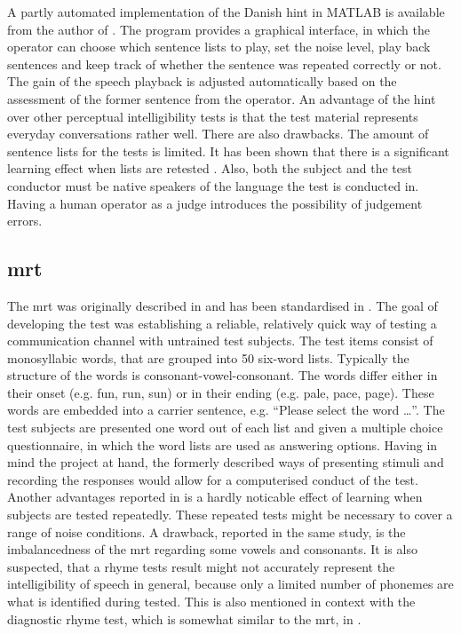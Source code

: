 A partly automated implementation of the Danish \gls{hint} in MATLAB\textsuperscript{\textregistered} is available from the author of \citep{hint_2011}. The program provides a graphical interface, in which the operator can choose which sentence lists to play, set the noise level, play back sentences and keep track of whether the sentence was repeated correctly or not. The gain of the speech playback is adjusted automatically based on the assessment of the former sentence from the operator.
An advantage of the \gls{hint} over other perceptual intelligibility tests is that the test material represents everyday conversations rather well.
There are also drawbacks. The amount of sentence lists for the tests is limited. It has been shown that there is a significant learning effect when lists are retested \citep[p. 205 f.]{hint_2011}.
Also, both the subject and the test conductor must be native speakers of the language the test is conducted in. Having a human operator as a judge introduces the possibility of judgement errors.

\subsection{\gls{mrt}}\label{ssec:mrt}
The \gls{mrt} was originally described in \citep{mrt_63} and has been standardised in \citep{ansi_s3.2}. The goal of developing the test was establishing a reliable, relatively quick way of testing a communication channel with untrained test subjects.
The test items consist of monosyllabic words, that are grouped into 50 six-word lists. Typically the structure of the words is consonant-vowel-consonant. The words differ either in their onset (e.g. fun, run, sun) or in their ending (e.g. pale, pace, page). 
These words are embedded into a carrier sentence, e.g. \enquote{Please select the word \dots}. 
The test subjects are presented one word out of each list and given a multiple choice questionnaire, in which the word lists are used as answering options. 
Having in mind the project at hand, the formerly described ways of presenting stimuli and recording the responses would allow for a computerised conduct of the test.
Another advantages reported in \citep[p. 17]{arl_us_army} is a hardly noticable effect of learning when subjects are tested repeatedly. These repeated tests might be necessary to cover a range of noise conditions.
A drawback, reported in the same study, is the imbalancedness of the \gls{mrt} regarding some vowels and consonants. 
It is also suspected, that a rhyme tests result might not accurately represent the intelligibility of speech in general, because only a limited number of phonemes are what is identified during tested. This is also mentioned in context with the diagnostic rhyme test, which is somewhat similar to the \gls{mrt}, in \citep{greenspan_98}. 

